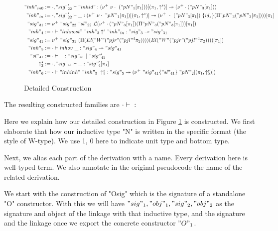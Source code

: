 \begin{figure}
  \begin{minipage}{0.8\linewidth}
    \centering
    \begin{align*}
      "inh"_{in0} &:= \goodInh{\cdot, "sig"_{22}'}{"inhid"}{(\nu^+ \ \nu\cdot \ ("pN"_1[\pi_1]))[(\pi_1, \uparrow^s)]}{(\nu^+ \cdot ("pN"_3[\pi_1]))} \\
      "inh"_{in} &:= \goodInh{\cdot , "sig"_{22}'}{\_}{(\nu^+ \ \nu\cdot \ "pN"_1[\pi_1])[(\pi_1, \uparrow^s)]}{(\nu^+ \ \cdot \ ("pN"_3[\pi_1]) \ \{id_s\} (\Pi "pN"_3 ("pN"_3[\pi_1])) )[\pi_1]}\\
      "sig"_{31} &:=  \nu^+ \ "sig"_{22} \ {"sl"_{22}}\  \cL(\nu^+ \cdot ("pN"_3[\pi_1])  (\Pi "pN"_3 ("pN"_3[\pi_1]))[\pi_1]) \\ 
      "inh"_4 &:= \goodInh{\cdot}{"inhnest" \ "inh"_3 \uparrow^s "inh"_{in}}{"sig"_3}{"sig"_{31}} \\
      "sig"_{41} &:= {\nu^+ \ "sig"_{31} \ (\Pi (El ("W" ("pjr" ("pjl"^4 \pi_2)))) (El ("W" ("pjr" ("pjl"^4 \pi_2))))[\pi_1])} \\ 
      "inh"_5 &:= \goodInh{\cdot}{inhov \ \_}{"sig"_4}{"sig"_{41}} \\ 
      "sl"_{41} &:= \goodSeal{\cdot}{\_}{"sig"_{41}}{"sig"_{41}'} \\ 
      \uparrow^s_2 &:= \goodTerm{\cdot, "sig"_{41}}{\_}{"sig"_4'[\pi_1]} \\ 
      "inh"_6 &:= \goodInh{\cdot}{"inhinh" \ "inh"_5 \ \uparrow^s_2}{"sig"_5}{(\nu^+ \ "sig"_{41} \{"sl"_{41}\} \ "pN"_2[(\pi_1, \uparrow^s_2)])}
    \end{align*}  
  \end{minipage}
  \caption{Detailed Construction}\label{fig:example-construction}
\end{figure}

The resulting constructed families are ${ {\cdot} \vdash {} : {} }$



Here we explain how  our detailed construction in Figure \cref{fig:example-construction} is constructed. We first elaborate that how our inductive type "N" is written in the specific format (the style of W-type). We use 1, 0 here to indicate unit type and bottom type. 

Next, we alias each part of the derivation with a name. Every derivation here is well-typed term. We also annotate in the original pseudocode the name of the related derivation. 

We start with the construction of "Osig" which is the signature of a standalone "O" constructor. With this we will have $"sig"_1, "obj"_1, "sig"_2, "obj"_2$ as the signature and object of the linkage with that inductive type, and the signature and the linkage once we export the concrete constructor $"O"_1$. 

